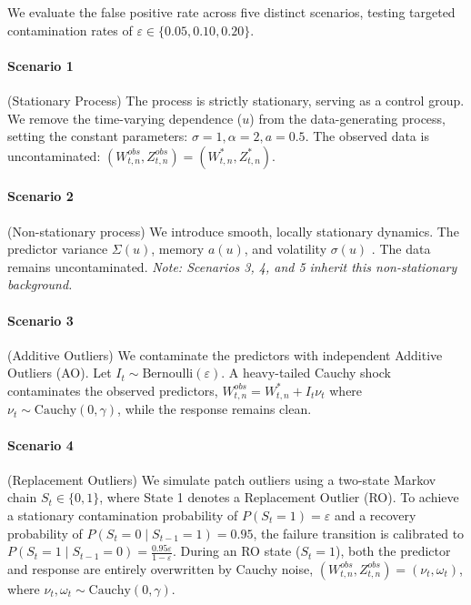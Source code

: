 \documentclass[12pt,a4paper]{article}
\theoremstyle{definition}
\theoremstyle{definition}
\theoremstyle{theorem}
\begin{document}
 We evaluate the false positive rate across five distinct scenarios, testing targeted contamination rates of $\varepsilon \in \{0.05, 0.10, 0.20\}$.


\paragraph{Scenario 1} (Stationary Process) The process is strictly stationary, serving as a control group. We remove the time-varying dependence ($u$) from the data-generating process, setting the constant parameters:
$   \sigma= 1 , \alpha = 2, 
    a = 0.5 .$
    The observed data is uncontaminated: $(W_{t,n}^{obs}, Z_{t,n}^{obs}) = (W_{t,n}^*, Z_{t,n}^*)$.
    
  \paragraph{Scenario 2}(Non-stationary process)  We introduce smooth, locally stationary dynamics. The predictor variance $\Sigma(u)$, memory $a(u)$, and volatility $\sigma(u)$ . The data remains uncontaminated. \textit{Note: Scenarios 3, 4, and 5 inherit this non-stationary background.}
    
  \paragraph{Scenario 3}(Additive Outliers)  We contaminate the predictors with independent Additive Outliers (AO). Let $I_t \sim \text{Bernoulli}(\varepsilon)$. A heavy-tailed Cauchy shock contaminates the observed predictors, $W_{t,n}^{obs} = W_{t,n}^* + I_t \nu_t$ where $\nu_t \sim \text{Cauchy}(0, \gamma)$, while the response remains clean.
    
      \paragraph{Scenario 4} (Replacement Outliers) We simulate patch outliers using a two-state Markov chain $S_t \in \{0, 1\}$, where State 1 denotes a Replacement Outlier (RO). To achieve a stationary contamination probability of $P(S_t = 1) = \varepsilon$ and a recovery probability of $P(S_t = 0 \mid S_{t-1} = 1) = 0.95$, the failure transition is calibrated to $P(S_t = 1 \mid S_{t-1} = 0) = \frac{0.95\varepsilon}{1-\varepsilon}$. During an RO state ($S_t = 1$), both the predictor and response are entirely overwritten by Cauchy noise, $(W_{t,n}^{obs}, Z_{t,n}^{obs}) = (\nu_t, \omega_t)$, where $\nu_t, \omega_t \sim \text{Cauchy}(0, \gamma)$.
     
\end{document}
